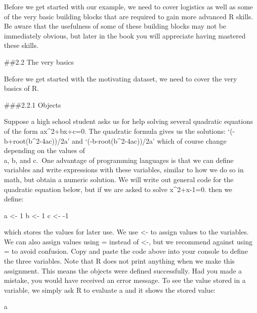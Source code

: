 \documentclass[
]{article}
\newenvironment{Shaded}{\begin{snugshade}}{\end{snugshade}}
\newcommand{\DecValTok}[1]{\textcolor[rgb]{0.00,0.00,0.81}{#1}}
\newcommand{\NormalTok}[1]{#1}
\newcommand{\OtherTok}[1]{\textcolor[rgb]{0.56,0.35,0.01}{#1}}
\newcommand{\SpecialCharTok}[1]{\textcolor[rgb]{0.00,0.00,0.00}{#1}}
\begin{document}
Before we get started with our example, we need to cover logistics as
well as some of the very basic building blocks that are required to gain
more advanced R skills. Be aware that the usefulness of some of these
building blocks may not be immediately obvious, but later in the book
you will appreciate having mastered these skills.

\#\#2.2 The very basics

Before we get started with the motivating dataset, we need to cover the
very basics of R.

\#\#\#2.2.1 Objects

Suppose a high school student asks us for help solving several quadratic
equations of the form ax\^{}2+bx+c=0. The quadratic formula gives us the
solutions: `(-b+root(b\^{}2-4ac))/2a' and `(-b-root(b\^{}2-4ac))/2a'
which of course change depending on the values of\\
a, b, and c.~One advantage of programming languages is that we can
define variables and write expressions with these variables, similar to
how we do so in math, but obtain a numeric solution. We will write out
general code for the quadratic equation below, but if we are asked to
solve x\^{}2+x-1=0. then we define:

\begin{Shaded}
\begin{Highlighting}[]
\NormalTok{a }\OtherTok{\textless{}{-}} \DecValTok{1}
\NormalTok{b }\OtherTok{\textless{}{-}} \DecValTok{1}
\NormalTok{c }\OtherTok{\textless{}{-}} \SpecialCharTok{{-}}\DecValTok{1}
\end{Highlighting}
\end{Shaded}

which stores the values for later use. We use \textless- to assign
values to the variables. We can also assign values using = instead of
\textless-, but we recommend against using = to avoid confusion. Copy
and paste the code above into your console to define the three
variables. Note that R does not print anything when we make this
assignment. This means the objects were defined successfully. Had you
made a mistake, you would have received an error message. To see the
value stored in a variable, we simply ask R to evaluate a and it shows
the stored value:

\begin{Shaded}
\begin{Highlighting}[]
\NormalTok{a}
\end{Highlighting}
\end{Shaded}
\end{document}
